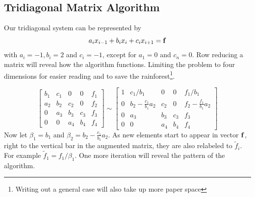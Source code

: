 \documentclass[10pt, a4paper]{amsart}
\begin{document}
\subsection{Tridiagonal Matrix Algorithm}
Our tridiagonal system can be represented by 
\begin{equation}
a_ix_{i-1} + b_ix_i + c_ix_{i+1} = \vb{f}
\end{equation}
with $a_i=-1,b_i=2$ and $c_i=-1$, except for $a_1=0$ and $c_n=0$. Row
reducing a matrix will reveal how the algorithm functions. Limiting
the problem to four dimensions for easier reading and to save the
rainforest\footnote{Writing out a general case will also take up more paper
space}.

\begin{equation}
\left[
\begin{array}{cccc|c}
b_1 & c_1 & 0 & 0 & f_1 \\
a_2 & b_2 & c_2 & 0  & f_2 \\
0 & a_3 & b_3 & c_3 & f_3 \\
0 & 0 & a_4 & b_4 & f_4
\end{array}
\right] \sim
\left[
\begin{array}{cccc|c}
1 & c_1/b_1 & 0 & 0 & f_1/b_1 \\
0 & b_2-\frac{c_1}{b_1}a_2 & c_2 & 0  & f_2-\frac{f_1}{b_1}a_2 \\
0 & a_3 & b_3 & c_3 & f_3 \\
0 & 0 & a_4 & b_4 & f_4
\end{array}
\right]
\end{equation}
Now let $\beta_1=b_1$ and $\beta_2=b_2-\frac{c_1}{b_1}a_2$. As new
elements start to appear in vector $\vb{f}$, right to the vertical bar
in the augmented matrix, they are also relabeled to $\tilde{f}_i$. For
example $\tilde{f}_1=f_1/\beta_1$. One more iteration will reveal the
pattern of the algorithm.
\end{document}
